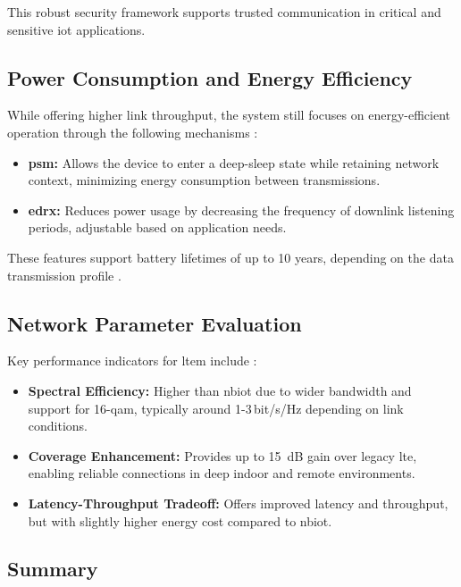 \documentclass[12pt, english, openany]{book}
\begin{document}
This robust security framework supports trusted communication in critical and sensitive \gls{iot} applications.

\subsection{Power Consumption and Energy Efficiency}

While offering higher link throughput, the system still focuses on energy-efficient operation through the following mechanisms \parencite{LTEM_POWER}:

\begin{itemize}
    \item \textbf{\gls{psm}:} Allows the device to enter a deep-sleep state while retaining network context, minimizing energy consumption between transmissions.
    \item \textbf{\gls{edrx}:} Reduces power usage by decreasing the frequency of downlink listening periods, adjustable based on application needs.
\end{itemize}

These features support battery lifetimes of up to 10 years, depending on the data transmission profile \parencite{LTEM_POWER}.

\subsection{Network Parameter Evaluation}

Key performance indicators for \gls{ltem} include \parencite{LTE_SYSTEM}:

\begin{itemize}
    \item \textbf{Spectral Efficiency:} Higher than \gls{nbiot} due to wider bandwidth and support for 16-\gls{qam}, typically around 1-3\,bit/s/Hz depending on link conditions.
    \item \textbf{Coverage Enhancement:} Provides up to \SI{15}{dB} gain over legacy \gls{lte}, enabling reliable connections in deep indoor and remote environments.
    \item \textbf{Latency-Throughput Tradeoff:} Offers improved latency and throughput, but with slightly higher energy cost compared to \gls{nbiot}.
\end{itemize}

\subsection{Summary}
\end{document}
